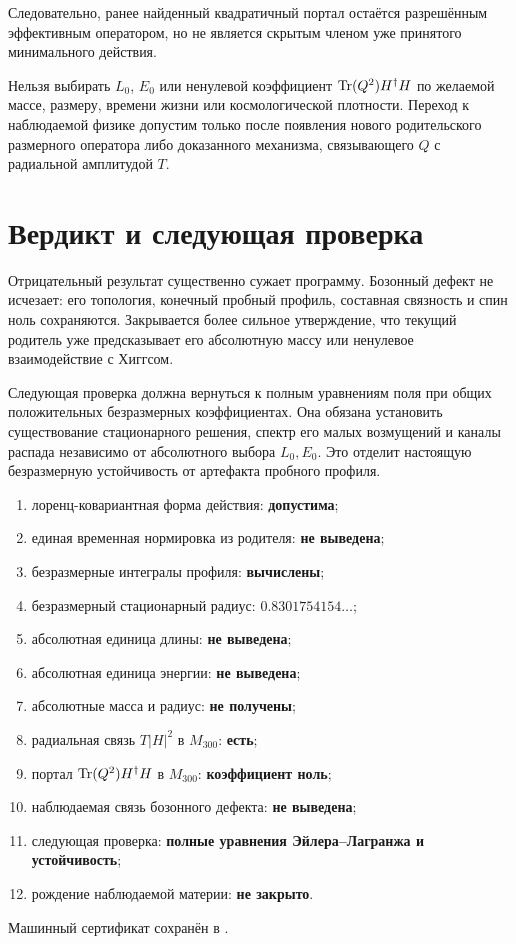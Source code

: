 Следовательно, ранее найденный квадратичный портал остаётся разрешённым
эффективным оператором, но не является скрытым членом уже принятого
минимального действия.

\begin{nogocriterion}
Нельзя выбирать $L_0$, $E_0$ или ненулевой коэффициент
$\operatorname{Tr}(Q^2)H^\dagger H$ по желаемой массе, размеру, времени жизни или
космологической плотности. Переход к наблюдаемой физике допустим только
после появления нового родительского размерного оператора либо доказанного
механизма, связывающего $Q$ с радиальной амплитудой $T$.
\end{nogocriterion}

\section{Вердикт и следующая проверка}

Отрицательный результат существенно сужает программу. Бозонный дефект не
исчезает: его топология, конечный пробный профиль, составная связность и
спин ноль сохраняются. Закрывается более сильное утверждение, что текущий
родитель уже предсказывает его абсолютную массу или ненулевое взаимодействие
с Хиггсом.

Следующая проверка должна вернуться к полным уравнениям поля при общих
положительных безразмерных коэффициентах. Она обязана установить
существование стационарного решения, спектр его малых возмущений и каналы
распада независимо от абсолютного выбора $L_0,E_0$. Это отделит настоящую
безразмерную устойчивость от артефакта пробного профиля.

\begin{protocol}
\begin{enumerate}
 \item лоренц-ковариантная форма действия: \textbf{допустима};
 \item единая временная нормировка из родителя: \textbf{не выведена};
 \item безразмерные интегралы профиля: \textbf{вычислены};
 \item безразмерный стационарный радиус: \textbf{$0.8301754154\ldots$};
 \item абсолютная единица длины: \textbf{не выведена};
 \item абсолютная единица энергии: \textbf{не выведена};
 \item абсолютные масса и радиус: \textbf{не получены};
 \item радиальная связь $T|H|^2$ в $M_{300}$: \textbf{есть};
 \item портал $\operatorname{Tr}(Q^2)H^\dagger H$ в $M_{300}$: \textbf{коэффициент ноль};
 \item наблюдаемая связь бозонного дефекта: \textbf{не выведена};
 \item следующая проверка:
 \textbf{полные уравнения Эйлера--Лагранжа и устойчивость};
 \item рождение наблюдаемой материи: \textbf{не закрыто}.
\end{enumerate}
\end{protocol}

Машинный сертификат сохранён в
.
